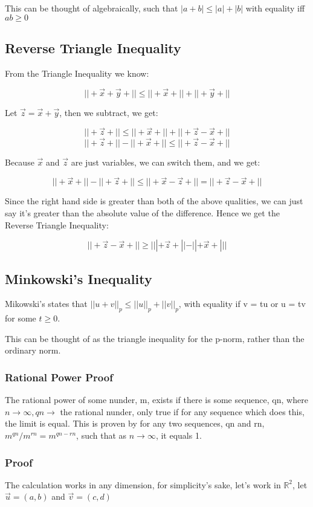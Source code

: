 \documentclass[11 pt, twoside]{article}
\begin{document}
This can be thought of algebraically, such that $|a + b| \leq |a| + |b|$ with equality iff $ab \geq 0$

\subsection{Reverse Triangle Inequality}

From the Triangle Inequality we know:

$$||+\vec{x} + \vec{y}+|| \leq ||+\vec{x}+|| + ||+\vec{y}+||$$

Let $\vec{z} = \vec{x} + \vec{y}$, then we subtract, we get:

$$||+\vec{z}+|| \leq ||+\vec{x}+|| + ||+\vec{z} - \vec{x}+||$$
$$||+\vec{z}+|| - ||+\vec{x}+|| \leq ||+\vec{z} - \vec{x}+||$$

Because $\vec{x}$ and $\vec{z}$ are just variables, we can switch them, and we
get:

$$||+\vec{x}+|| - ||+\vec{z}+|| \leq ||+\vec{x} - \vec{z}+|| = ||+\vec{z}
- \vec{x}+||$$

Since the right hand side is greater than both of the above qualities, we can
just say it's greater than the absolute value of the difference. Hence we get
the Reverse Triangle Inequality:

$$||+\vec{z} - \vec{x}+|| \geq |||+\vec{z}+|| - ||+\vec{x}+|||$$

\subsection{Minkowski's Inequality}
Mikowski's states that $||u + v||_p \leq ||u||_p + ||v||_p$, with equality if v = tu or u = tv for some $t \geq 0$.

This can be thought of as the triangle inequality for the p-norm, rather than the ordinary norm.

\subsubsection{Rational Power Proof}
The rational power of some nunder, m,  exists if there is some sequence, qn, where $n \to \infty, qn \to$ the rational nunder, only true if for any sequence which does this, the limit is equal.
This is proven by for any two sequences, qn and rn, $m^{qn}/m^{rn} = m^{qn-rn}$, such that as $n \to \infty$, it equals 1.

\subsubsection{Proof}
The calculation works in any dimension, for simplicity's sake, let's work in
$\mathbb{R}^2$, let $\vec{u} = (a, b)$ and $\vec{v} = (c, d)$
\end{document}
